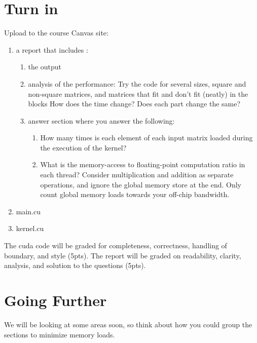 \documentclass{article}
\begin{document}
\section{Turn in}
Upload to the course Canvas site:
\begin{enumerate}
\item a report that includes :
	\begin{enumerate}
	\item the output
	\item analysis of the performance: Try the code for several sizes, square and non-square matrices, and matrices that fit and don't fit (neatly) in the blocks  How does the time change?  Does each part change the same?
	\item answer section where you answer the following:
		\begin{enumerate}
		\item How many times is each element of each input matrix loaded during the execution of the kernel?
		\item What is the memory-access to floating-point computation ratio in each thread? Consider multiplication and addition as separate operations, and ignore the global memory store at the end. Only count global memory loads towards your off-chip bandwidth.
		\end{enumerate}
	\end{enumerate}
\item main.cu
\item kernel.cu
\end{enumerate}
The cuda code will be graded for completeness, correctness, handling of boundary, and style (5pts).  The report will be graded on readability, clarity, analysis, and solution to the questions (5pts).


\section{Going Further}
We will be looking at some areas soon, so think about how you could group the sections to minimize memory loads.
\end{document}
